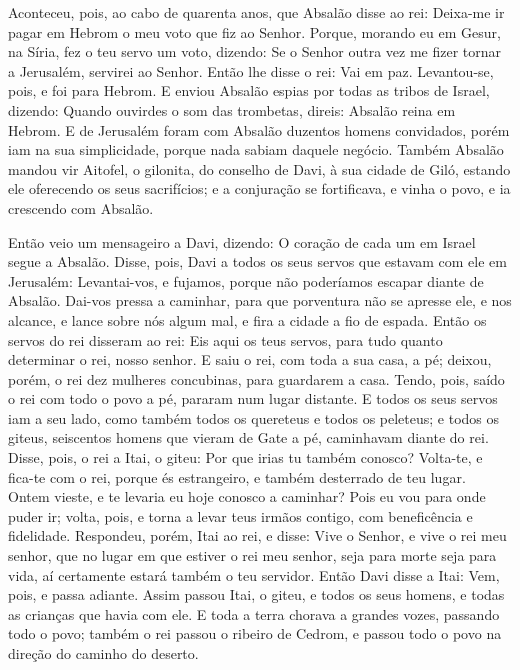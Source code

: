 Aconteceu, pois, ao cabo de quarenta anos, que Absalão disse ao
rei: Deixa-me ir pagar em Hebrom o meu voto que fiz ao Senhor.
Porque, morando eu em Gesur, na Síria, fez o teu servo um voto,
dizendo: Se o Senhor outra vez me fizer tornar a Jerusalém, servirei
ao Senhor. Então lhe disse o rei: Vai em paz. Levantou-se, pois,
e foi para Hebrom. E enviou Absalão espias por todas as
tribos de Israel, dizendo: Quando ouvirdes o som das trombetas,
direis: Absalão reina em Hebrom. E de Jerusalém foram com
Absalão duzentos homens convidados, porém iam na sua simplicidade,
porque nada sabiam daquele negócio. Também Absalão mandou vir
Aitofel, o gilonita, do conselho de Davi, à sua cidade de Giló,
estando ele oferecendo os seus sacrifícios; e a conjuração se
fortificava, e vinha o povo, e ia crescendo com Absalão.

Então veio um mensageiro a Davi, dizendo: O coração de cada um em
Israel segue a Absalão. Disse, pois, Davi a todos os seus
servos que estavam com ele em Jerusalém: Levantai-vos, e fujamos,
porque não poderíamos escapar diante de Absalão. Dai-vos pressa a
caminhar, para que porventura não se apresse ele, e nos alcance, e
lance sobre nós algum mal, e fira a cidade a fio de espada.
Então os servos do rei disseram ao rei: Eis aqui os teus
servos, para tudo quanto determinar o rei, nosso senhor. E
saiu o rei, com toda a sua casa, a pé; deixou, porém, o rei dez
mulheres concubinas, para guardarem a casa. Tendo, pois,
saído o rei com todo o povo a pé, pararam num lugar distante.
E todos os seus servos iam a seu lado, como também todos os
quereteus e todos os peleteus; e todos os giteus, seiscentos homens
que vieram de Gate a pé, caminhavam diante do rei. Disse,
pois, o rei a Itai, o giteu: Por que irias tu também conosco?
Volta-te, e fica-te com o rei, porque és estrangeiro, e também
desterrado de teu lugar. Ontem vieste, e te levaria eu hoje
conosco a caminhar? Pois eu vou para onde puder ir; volta, pois, e
torna a levar teus irmãos contigo, com beneficência e fidelidade.
Respondeu, porém, Itai ao rei, e disse: Vive o Senhor, e vive
o rei meu senhor, que no lugar em que estiver o rei meu senhor, seja
para morte seja para vida, aí certamente estará também o teu
servidor. Então Davi disse a Itai: Vem, pois, e passa
adiante. Assim passou Itai, o giteu, e todos os seus homens, e todas
as crianças que havia com ele. E toda a terra chorava a
grandes vozes, passando todo o povo; também o rei passou o ribeiro
de Cedrom, e passou todo o povo na direção do caminho do deserto.

